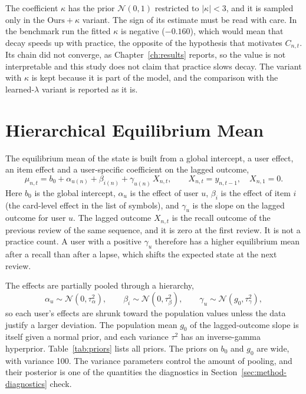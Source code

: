 The coefficient $\kappa$ has the prior $\mathcal N(0,1)$ restricted to $|\kappa| < 3$, and it is
sampled only in the $\text{Ours}+\kappa$ variant. The sign of its estimate must be read with care.
In the benchmark run the fitted $\kappa$ is negative ($-0.160$), which would mean that decay speeds
up with practice, the opposite of the hypothesis that motivates $C_{n,t}$. Its chain did not
converge, as Chapter~\ref{ch:results} reports, so the value is not interpretable and this study does
not claim that practice slows decay. The variant with $\kappa$ is kept because it is part of the
model, and the comparison with the learned-$\lambda$ variant is reported as it is.

\section{Hierarchical Equilibrium Mean}
\label{sec:method-mean}

The equilibrium mean of the state is built from a global intercept, a user effect, an item effect
and a user-specific coefficient on the lagged outcome,
\begin{equation}\label{eq:mu}
  \mu_{n,t} = b_0 + \alpha_{u(n)} + \beta_{i(n)} + \gamma_{u(n)}\,X_{n,t},
  \qquad X_{n,t} = y_{n,t-1},\quad X_{n,1} = 0.
\end{equation}
Here $b_0$ is the global intercept, $\alpha_u$ is the effect of user $u$, $\beta_i$ is the effect of
item $i$ (the card-level effect in the list of symbols), and $\gamma_u$ is the slope on the lagged
outcome for user $u$. The lagged outcome $X_{n,t}$ is the recall outcome of the previous review of
the same sequence, and it is zero at the first review. It is not a practice count. A user with a
positive $\gamma_u$ therefore has a higher equilibrium mean after a recall than after a lapse, which
shifts the expected state at the next review.

The effects are partially pooled through a hierarchy,
\begin{equation}\label{eq:hier}
  \alpha_u \sim \mathcal N(0, \tau^2_\alpha), \qquad
  \beta_i \sim \mathcal N(0, \tau^2_\beta), \qquad
  \gamma_u \sim \mathcal N(g_0, \tau^2_\gamma),
\end{equation}
so each user's effects are shrunk toward the population values unless the data justify a larger
deviation. The population mean $g_0$ of the lagged-outcome slope is itself given a normal prior, and
each variance $\tau^2$ has an inverse-gamma hyperprior. Table~\ref{tab:priors} lists all priors.
The priors on $b_0$ and $g_0$ are wide, with variance 100. The variance parameters control the
amount of pooling, and their posterior is one of the quantities the diagnostics in
Section~\ref{sec:method-diagnostics} check.

